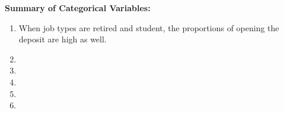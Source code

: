 \documentclass[11pt,a4paper]{article}
\begin{document}
\begin{figure}[H]
        \qquad
    \end{figure}
    
    \noindent \textbf{Summary of Categorical Variables:}
    \begin{enumerate}
        \item When job types are retired and student, the proportions of opening the deposit are high as well.
        \item 
        \item
        \item
        \item
        \item
    \end{enumerate}
    
\end{document}
